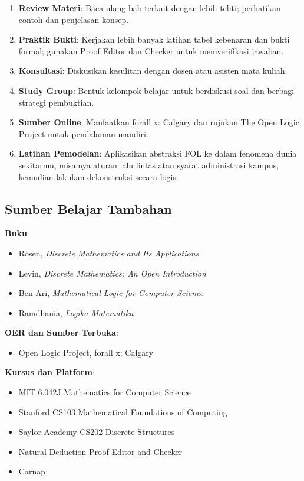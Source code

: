 \begin{enumerate}
  \item \textbf{Review Materi}: Baca ulang bab terkait dengan lebih teliti; perhatikan contoh dan penjelasan konsep.
  \item \textbf{Praktik Bukti}: Kerjakan lebih banyak latihan tabel kebenaran dan bukti formal; gunakan Proof Editor dan Checker \cite{proofs_checker} untuk memverifikasi jawaban.
  \item \textbf{Konsultasi}: Diskusikan kesulitan dengan dosen atau asisten mata kuliah.
  \item \textbf{Study Group}: Bentuk kelompok belajar untuk berdiskusi soal dan berbagi strategi pembuktian.
  \item \textbf{Sumber Online}: Manfaatkan forall x: Calgary \cite{forallx} dan rujukan The Open Logic Project untuk pendalaman mandiri.
  \item \textbf{Latihan Pemodelan}: Aplikasikan abstraksi FOL ke dalam fenomena dunia sekitarmu, misalnya aturan lalu lintas atau syarat administrasi kampus, kemudian lakukan dekonstruksi secara logis.
\end{enumerate}

\subsection{Sumber Belajar Tambahan}

\textbf{Buku}:
\begin{itemize}
  \item Rosen, \textit{Discrete Mathematics and Its Applications} \cite{rosen2019}
  \item Levin, \textit{Discrete Mathematics: An Open Introduction} \cite{levin_discrete}
  \item Ben-Ari, \textit{Mathematical Logic for Computer Science} \cite{benari_matlogic}
  \item Ramdhania, \textit{Logika Matematika} \cite{ramdhania2023}
\end{itemize}

\textbf{OER dan Sumber Terbuka}:
\begin{itemize}
  \item Open Logic Project, forall x: Calgary \cite{openlogic,forallx}
\end{itemize}

\textbf{Kursus dan Platform}:
\begin{itemize}
  \item MIT 6.042J Mathematics for Computer Science \cite{mit_6042}
  \item Stanford CS103 Mathematical Foundations of Computing \cite{stanford_cs103}
  \item Saylor Academy CS202 Discrete Structures \cite{saylor_cs202}
  \item Natural Deduction Proof Editor and Checker \cite{proofs_checker}
  \item Carnap \cite{carnap}
\end{itemize}
